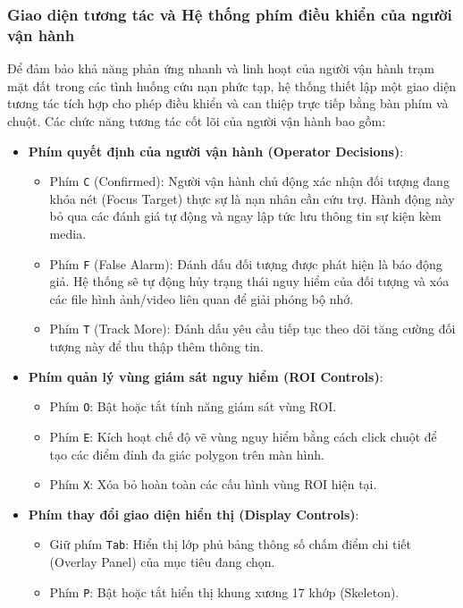 \subsubsection{Giao diện tương tác và Hệ thống phím điều khiển của người vận hành}

Để đảm bảo khả năng phản ứng nhanh và linh hoạt của người vận hành trạm mặt đất trong các tình huống cứu nạn phức tạp, hệ thống thiết lập một giao diện tương tác tích hợp cho phép điều khiển và can thiệp trực tiếp bằng bàn phím và chuột. Các chức năng tương tác cốt lõi của người vận hành bao gồm:
\begin{itemize}
    \item \textbf{Phím quyết định của người vận hành (Operator Decisions)}:
    \begin{itemize}
        \item Phím \texttt{C} (Confirmed): Người vận hành chủ động xác nhận đối tượng đang khóa nét (Focus Target) thực sự là nạn nhân cần cứu trợ. Hành động này bỏ qua các đánh giá tự động và ngay lập tức lưu thông tin sự kiện kèm media.
        \item Phím \texttt{F} (False Alarm): Đánh dấu đối tượng được phát hiện là báo động giả. Hệ thống sẽ tự động hủy trạng thái nguy hiểm của đối tượng và xóa các file hình ảnh/video liên quan để giải phóng bộ nhớ.
        \item Phím \texttt{T} (Track More): Đánh dấu yêu cầu tiếp tục theo dõi tăng cường đối tượng này để thu thập thêm thông tin.
    \end{itemize}
    \item \textbf{Phím quản lý vùng giám sát nguy hiểm (ROI Controls)}:
    \begin{itemize}
        \item Phím \texttt{O}: Bật hoặc tắt tính năng giám sát vùng ROI.
        \item Phím \texttt{E}: Kích hoạt chế độ vẽ vùng nguy hiểm bằng cách click chuột để tạo các điểm đỉnh đa giác polygon trên màn hình.
        \item Phím \texttt{X}: Xóa bỏ hoàn toàn các cấu hình vùng ROI hiện tại.
    \end{itemize}
    \item \textbf{Phím thay đổi giao diện hiển thị (Display Controls)}:
    \begin{itemize}
        \item Giữ phím \texttt{Tab}: Hiển thị lớp phủ bảng thông số chấm điểm chi tiết (Overlay Panel) của mục tiêu đang chọn.
        \item Phím \texttt{P}: Bật hoặc tắt hiển thị khung xương 17 khớp (Skeleton).

\end{itemize}
\end{itemize}
